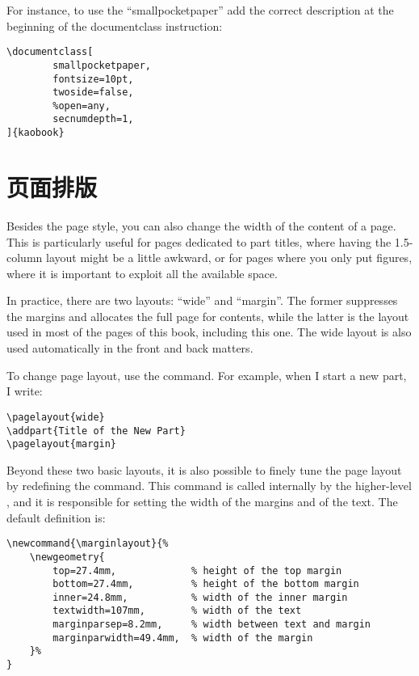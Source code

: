 For instance, to use the \enquote{smallpocketpaper} add the correct
description at the beginning of the documentclass instruction:
\begin{lstlisting}
\documentclass[
		smallpocketpaper,
		fontsize=10pt,
		twoside=false,
		%open=any,
		secnumdepth=1,
]{kaobook}
\end{lstlisting}

\section{页面排版}

Besides the page style, you can also change the width of the content of
a page. This is particularly useful for pages dedicated to part titles,
where having the 1.5-column layout might be a little awkward, or for
pages where you only put figures, where it is important to exploit all
the available space.

In practice, there are two layouts: \enquote{wide} and \enquote{margin}.
The former suppresses the margins and allocates the full page for
contents, while the latter is the layout used in most of the pages of
this book, including this one. The wide layout is also used
automatically in the front and back matters.


To change page layout, use the  command. For
example, when I start a new part, I write:

\begin{lstlisting}
\pagelayout{wide}
\addpart{Title of the New Part}
\pagelayout{margin}
\end{lstlisting}

Beyond these two basic layouts, it is also possible to finely tune the
page layout by redefining the  command. This
command is called internally by the higher-level ,
and it is responsible for setting the width of the margins and of the
text. The default definition is:

\begin{lstlisting}
\newcommand{\marginlayout}{%
	\newgeometry{
		top=27.4mm,				% height of the top margin
		bottom=27.4mm,			% height of the bottom margin
		inner=24.8mm,			% width of the inner margin
		textwidth=107mm,		% width of the text
		marginparsep=8.2mm,		% width between text and margin
		marginparwidth=49.4mm,	% width of the margin
	}%
}
\end{lstlisting}

